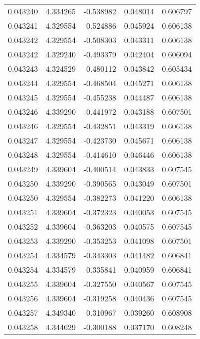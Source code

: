 \begin{tabular}{lrrrr}
0.043240    &  4.334265 & -0.538982 &  0.048014 &             0.606797 \\
0.043241    &  4.329554 & -0.524886 &  0.045924 &             0.606138 \\
0.043242    &  4.329554 & -0.508303 &  0.043311 &             0.606138 \\
0.043242    &  4.329240 & -0.493379 &  0.042404 &             0.606094 \\
0.043243    &  4.324529 & -0.480112 &  0.043842 &             0.605434 \\
0.043244    &  4.329554 & -0.468504 &  0.045271 &             0.606138 \\
0.043245    &  4.329554 & -0.455238 &  0.044487 &             0.606138 \\
0.043246    &  4.339290 & -0.441972 &  0.043188 &             0.607501 \\
0.043246    &  4.329554 & -0.432851 &  0.043319 &             0.606138 \\
0.043247    &  4.329554 & -0.423730 &  0.045671 &             0.606138 \\
0.043248    &  4.329554 & -0.414610 &  0.046446 &             0.606138 \\
0.043249    &  4.339604 & -0.400514 &  0.043833 &             0.607545 \\
0.043250    &  4.339290 & -0.390565 &  0.043049 &             0.607501 \\
0.043250    &  4.329554 & -0.382273 &  0.041220 &             0.606138 \\
0.043251    &  4.339604 & -0.372323 &  0.040053 &             0.607545 \\
0.043252    &  4.339604 & -0.363203 &  0.040575 &             0.607545 \\
0.043253    &  4.339290 & -0.353253 &  0.041098 &             0.607501 \\
0.043254    &  4.334579 & -0.343303 &  0.041482 &             0.606841 \\
0.043254    &  4.334579 & -0.335841 &  0.040959 &             0.606841 \\
0.043255    &  4.339604 & -0.327550 &  0.040567 &             0.607545 \\
0.043256    &  4.339604 & -0.319258 &  0.040436 &             0.607545 \\
0.043257    &  4.349340 & -0.310967 &  0.039260 &             0.608908 \\
0.043258    &  4.344629 & -0.300188 &  0.037170 &             0.608248 \\

\end{tabular}
